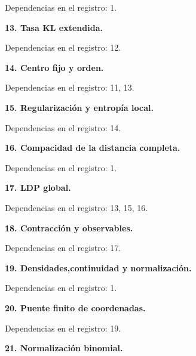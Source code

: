 \documentclass[spanish,11pt,a4paper]{article}
\begin{document}

Dependencias en el registro: 1.

\textbf{13. Tasa KL extendida.}


Dependencias en el registro: 12.

\textbf{14. Centro fijo y orden.}


Dependencias en el registro: 11, 13.

\textbf{15. Regularización y entropía local.}


Dependencias en el registro: 14.

\textbf{16. Compacidad de la distancia completa.}


Dependencias en el registro: 1.

\textbf{17. LDP global.}


Dependencias en el registro: 13, 15, 16.

\textbf{18. Contracción y observables.}


Dependencias en el registro: 17.

\textbf{19. Densidades,continuidad y normalización.}


Dependencias en el registro: 1.

\textbf{20. Puente finito de coordenadas.}


Dependencias en el registro: 19.

\textbf{21. Normalización binomial.}

\end{document}

